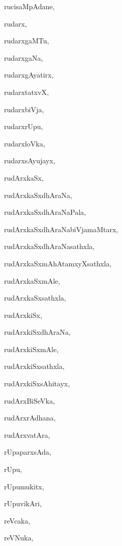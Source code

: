 \begin{multicols}{2}
{rucisaMpAdane}, \pageref{rucisaMpAdane}

{rudarx}, \pageref{rudarx}

{rudarxgaMTu}, \pageref{rudarxgaMTu}

{rudarxgaNa}, \pageref{rudarxgaNa}

{rudarxgAyatirx}, \pageref{rudarxgAyatirx}

{rudarxtatxvX}, \pageref{rudarxtatxvX}

{rudarxbiVja}, \pageref{rudarxbiVja}

{rudarxrUpu}, \pageref{rudarxrUpu}

{rudarxloVka}, \pageref{rudarxloVka}

{rudarxsAyujayx}, \pageref{rudarxsAyujayx}

{rudArxkaSx}, \pageref{rudArxkaSx}

{rudArxkaSxdhAraNa}, \pageref{rudArxkaSxdhAraNa}

{rudArxkaSxdhAraNaPala}, \pageref{rudArxkaSxdhAraNaPala}

{rudArxkaSxdhAraNabiVjamaMtarx}, \pageref{rudArxkaSxdhAraNabiVjamaMtarx}

{rudArxkaSxdhAraNasathxla}, \pageref{rudArxkaSxdhAraNasathxla}

{rudArxkaSxmAhAtamxyXsathxla}, \pageref{rudArxkaSxmAhAtamxyXsathxla}

{rudArxkaSxmAle}, \pageref{rudArxkaSxmAle}

{rudArxkaSxsathxla}, \pageref{rudArxkaSxsathxla}

{rudArxkiSx}, \pageref{rudArxkiSx}

{rudArxkiSxdhAraNa}, \pageref{rudArxkiSxdhAraNa}

{rudArxkiSxmAle}, \pageref{rudArxkiSxmAle}

{rudArxkiSxsathxla}, \pageref{rudArxkiSxsathxla}

{rudArxkiSxsAhitayx}, \pageref{rudArxkiSxsAhitayx}

{rudArxBiSeVka}, \pageref{rudArxBiSeVka}

{rudArxrAdhana}, \pageref{rudArxrAdhana}

{rudArxvatAra}, \pageref{rudArxvatAra}

{rUpaparxsAda}, \pageref{rUpaparxsAda}

{rUpu}, \pageref{rUpu}

{rUpumukitx}, \pageref{rUpumukitx}

{rUpuvikAri}, \pageref{rUpuvikAri}

{reVcaka}, \pageref{reVcaka}

{reVNuka}, \pageref{reVNuka}


\end{multicols}
